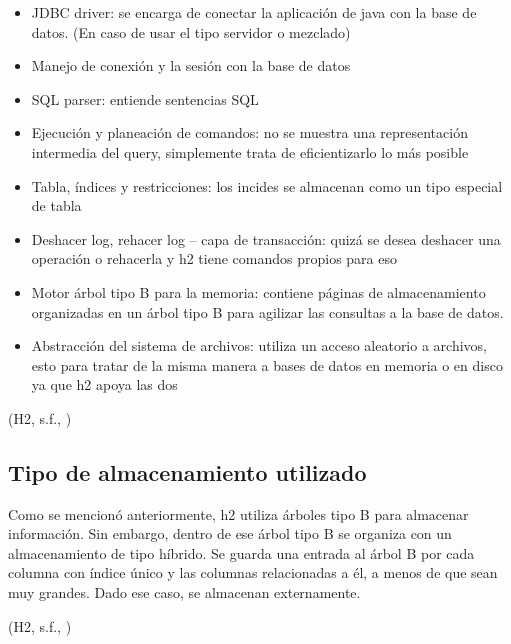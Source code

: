 \documentclass{acmart}
\begin{document}
\begin{itemize}

\item JDBC driver: se encarga de conectar la aplicación de java con la base de datos. (En caso de usar el tipo servidor o mezclado)

\item Manejo de conexión y la sesión con la base de datos

\item SQL parser: entiende sentencias SQL

\item Ejecución y planeación de comandos: no se muestra una representación intermedia del query, simplemente trata de eficientizarlo lo más posible

\item Tabla, índices y restricciones: los incides se almacenan como un tipo especial de tabla

\item Deshacer log, rehacer log – capa de transacción: quizá se desea deshacer una operación o rehacerla y h2 tiene comandos propios para eso

\item Motor árbol tipo B para la memoria: contiene páginas de almacenamiento organizadas en un árbol tipo B para agilizar las consultas a la base de datos.

\item Abstracción del sistema de archivos: utiliza un acceso aleatorio a archivos, esto para tratar de la misma manera a bases de datos en memoria o en disco ya que h2 apoya las dos



\end{itemize}

(H2, s.f., \cite{h2features})

\subsection{Tipo de almacenamiento utilizado}

Como se mencionó anteriormente, h2 utiliza árboles tipo B para almacenar información. Sin embargo, dentro de ese árbol tipo B se organiza con un almacenamiento de tipo híbrido. Se guarda una entrada al árbol B por cada columna con índice único y las columnas relacionadas a él, a menos de que sean muy grandes. Dado ese caso, se almacenan externamente.   

(H2, s.f., \cite{h2performance})
\end{document}
